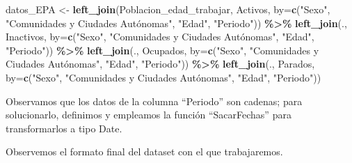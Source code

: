 \documentclass[notspecified,article,submit,moreauthors,pdftex]{Definitions/mdpi}
\newenvironment{Shaded}{\begin{snugshade}}{\end{snugshade}}
\newcommand{\AttributeTok}[1]{\textcolor[rgb]{0.13,0.29,0.53}{#1}}
\newcommand{\CommentTok}[1]{\textcolor[rgb]{0.56,0.35,0.01}{\textit{#1}}}
\newcommand{\FunctionTok}[1]{\textcolor[rgb]{0.13,0.29,0.53}{\textbf{#1}}}
\newcommand{\NormalTok}[1]{#1}
\newcommand{\OtherTok}[1]{\textcolor[rgb]{0.56,0.35,0.01}{#1}}
\newcommand{\SpecialCharTok}[1]{\textcolor[rgb]{0.81,0.36,0.00}{\textbf{#1}}}
\newcommand{\StringTok}[1]{\textcolor[rgb]{0.31,0.60,0.02}{#1}}
\begin{document}
\begin{Shaded}
\begin{Highlighting}[]
\NormalTok{datos\_EPA }\OtherTok{\textless{}{-}} \FunctionTok{left\_join}\NormalTok{(Poblacion\_edad\_trabajar, Activos, }\AttributeTok{by=}\FunctionTok{c}\NormalTok{(}\StringTok{"Sexo"}\NormalTok{, }\StringTok{"Comunidades y Ciudades Autónomas"}\NormalTok{, }\StringTok{"Edad"}\NormalTok{, }\StringTok{"Periodo"}\NormalTok{)) }\SpecialCharTok{\%\textgreater{}\%}
                \FunctionTok{left\_join}\NormalTok{(., Inactivos, }\AttributeTok{by=}\FunctionTok{c}\NormalTok{(}\StringTok{"Sexo"}\NormalTok{, }\StringTok{"Comunidades y Ciudades Autónomas"}\NormalTok{, }\StringTok{"Edad"}\NormalTok{, }\StringTok{"Periodo"}\NormalTok{)) }\SpecialCharTok{\%\textgreater{}\%}
                \FunctionTok{left\_join}\NormalTok{(., Ocupados, }\AttributeTok{by=}\FunctionTok{c}\NormalTok{(}\StringTok{"Sexo"}\NormalTok{, }\StringTok{"Comunidades y Ciudades Autónomas"}\NormalTok{, }\StringTok{"Edad"}\NormalTok{, }\StringTok{"Periodo"}\NormalTok{)) }\SpecialCharTok{\%\textgreater{}\%}
                \FunctionTok{left\_join}\NormalTok{(., Parados, }\AttributeTok{by=}\FunctionTok{c}\NormalTok{(}\StringTok{"Sexo"}\NormalTok{, }\StringTok{"Comunidades y Ciudades Autónomas"}\NormalTok{, }\StringTok{"Edad"}\NormalTok{, }\StringTok{"Periodo"}\NormalTok{))}
\end{Highlighting}
\end{Shaded}

Observamos que los datos de la columna ``Periodo'' son cadenas; para
solucionarlo, definimos y empleamos la función ``SacarFechas'' para
transformarlos a tipo Date.

\begin{Shaded}
\end{Shaded}

Observemos el formato final del dataset con el que trabajaremos.
\end{document}
